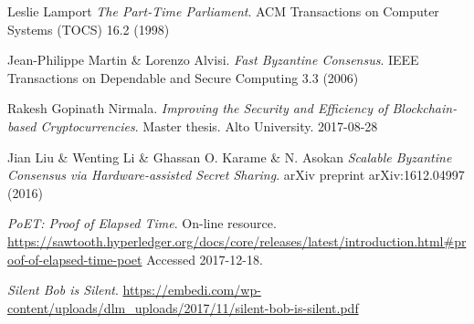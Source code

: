 \documentclass[12pt]{article}
\begin{document}
\begin{thebibliography}{9}
		Leslie Lamport
		\textit{The Part-Time Parliament}.
		ACM Transactions on Computer Systems (TOCS) 16.2 (1998)

		Jean-Philippe Martin \& Lorenzo Alvisi.
		\textit{Fast Byzantine Consensus}.
		IEEE Transactions on Dependable and Secure Computing 3.3 (2006)

		Rakesh Gopinath Nirmala.
		\textit{Improving the Security and Efficiency of Blockchain-based Cryptocurrencies}. 
		Master thesis. Alto University. 2017-08-28

		Jian Liu \& Wenting Li \& Ghassan O. Karame \& N. Asokan
 		\textit{Scalable Byzantine Consensus via Hardware-assisted Secret Sharing}.
 		arXiv preprint arXiv:1612.04997 (2016)

		\textit{PoET: Proof of Elapsed Time}.
		On-line resource. 
		\url{https://sawtooth.hyperledger.org/docs/core/releases/latest/introduction.html#proof-of-elapsed-time-poet}
		Accessed 2017-12-18.

	    \textit{Silent Bob is Silent}.
	    \url{https://embedi.com/wp-content/uploads/dlm_uploads/2017/11/silent-bob-is-silent.pdf}
	\end{thebibliography}
\end{document}
